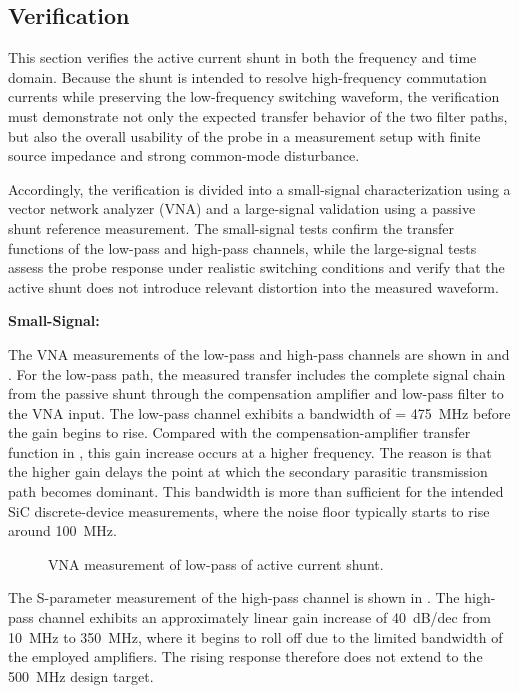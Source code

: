 

\subsection{Verification}
\label{sec:CurrentVerification}

This section verifies the active current shunt in both the frequency and time domain.
Because the shunt is intended to resolve high-frequency commutation currents while preserving the low-frequency switching waveform, the verification must demonstrate not only the expected transfer behavior of the two filter paths, but also the overall usability of the probe in a measurement setup with finite source impedance and strong common-mode disturbance.

Accordingly, the verification is divided into a small-signal characterization using a vector network analyzer (VNA) and a large-signal validation using a passive shunt reference measurement.
The small-signal tests confirm the transfer functions of the low-pass and high-pass channels, while the large-signal tests assess the probe response under realistic switching conditions and verify that the active shunt does not introduce relevant distortion into the measured waveform.

\textbf{Small-Signal:}

The VNA measurements of the low-pass and high-pass channels are shown in  and .
For the low-pass path, the measured transfer includes the complete signal chain from the passive shunt through the compensation amplifier and low-pass filter to the VNA input.
The low-pass channel exhibits a bandwidth of  = \SI{475}{MHz} before the gain begins to rise.
Compared with the compensation-amplifier transfer function in , this gain increase occurs at a higher frequency.
The reason is that the higher gain delays the point at which the secondary parasitic transmission path becomes dominant.
This bandwidth is more than sufficient for the intended SiC discrete-device measurements, where the noise floor typically starts to rise around \SI{100}{MHz}.
	
\begin{figure}[ht]
	\centering
	
	\caption{VNA measurement of low-pass of active current shunt.}\label{fig:VNA_Shunt_LP}
\end{figure}

The S-parameter measurement of the high-pass channel is shown in .
The high-pass channel exhibits an approximately linear gain increase of \SI{+40}{dB/dec} from \SI{10}{MHz} to \SI{350}{MHz}, where it begins to roll off due to the limited bandwidth of the employed amplifiers.
The rising response therefore does not extend to the \SI{500}{MHz} design target.

